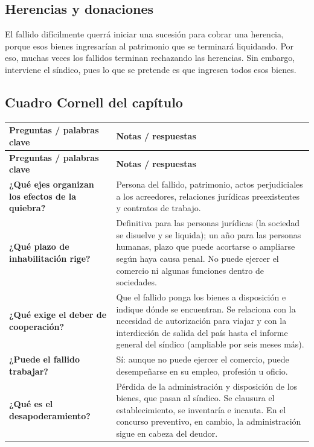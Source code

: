 \documentclass[12pt,oneside]{book}
\begin{document}
\subsection{Herencias y donaciones}

El fallido difícilmente querrá iniciar una sucesión para cobrar una herencia, porque esos bienes ingresarían al patrimonio que se terminará liquidando. Por eso, muchas veces los fallidos terminan rechazando las herencias. Sin embargo, interviene el síndico, pues lo que se pretende es que ingresen todos esos bienes.

\subsection*{Cuadro Cornell del capítulo}

\begin{longtable}{>{\raggedright\arraybackslash}p{} >{\raggedright\arraybackslash}p{}}
\toprule
\textbf{Preguntas / palabras clave} & \textbf{Notas / respuestas} \\
\midrule
\endfirsthead
\toprule
\textbf{Preguntas / palabras clave} & \textbf{Notas / respuestas} \\
\midrule
\endhead
\textbf{¿Qué ejes organizan los efectos de la quiebra?} & Persona del fallido, patrimonio, actos perjudiciales a los acreedores, relaciones jurídicas preexistentes y contratos de trabajo. \\[0.6em]
\textbf{¿Qué plazo de inhabilitación rige?} & Definitiva para las personas jurídicas (la sociedad se disuelve y se liquida); un año para las personas humanas, plazo que puede acortarse o ampliarse según haya causa penal. No puede ejercer el comercio ni algunas funciones dentro de sociedades. \\[0.6em]
\textbf{¿Qué exige el deber de cooperación?} & Que el fallido ponga los bienes a disposición e indique dónde se encuentran. Se relaciona con la necesidad de autorización para viajar y con la interdicción de salida del país hasta el informe general del síndico (ampliable por seis meses más). \\[0.6em]
\textbf{¿Puede el fallido trabajar?} & Sí: aunque no puede ejercer el comercio, puede desempeñarse en su empleo, profesión u oficio. \\[0.6em]
\textbf{¿Qué es el desapoderamiento?} & Pérdida de la administración y disposición de los bienes, que pasan al síndico. Se clausura el establecimiento, se inventaría e incauta. En el concurso preventivo, en cambio, la administración sigue en cabeza del deudor. \\[0.6em]

\end{longtable}
\end{document}

